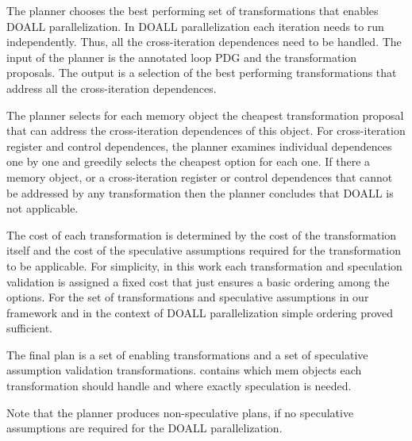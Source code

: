 The planner chooses the best performing set of transformations that
enables DOALL parallelization.
%
In DOALL parallelization each iteration needs to run independently.
Thus, all the cross-iteration dependences need to be handled.
%
The input of the planner is the annotated loop PDG and the
transformation proposals.
%
The output is a selection of the best performing transformations that
address all the cross-iteration dependences. 


%
The planner selects for each memory object the cheapest transformation
proposal that can address the cross-iteration dependences of this
object.
%
%
For cross-iteration register and control dependences, the planner
examines individual dependences one by one and greedily selects the
cheapest option for each one.  
%
If there a memory object, or a cross-iteration register or control
dependences that cannot be addressed by any transformation then the
planner concludes that DOALL is not applicable.


The cost of each transformation is determined by the cost of the
transformation itself and the cost of the speculative assumptions
required for the transformation to be applicable. 
%
For simplicity, in this work each transformation and speculation
validation is assigned a fixed 
cost that just ensures a basic ordering
among the options.
%
%
For the set of transformations and speculative assumptions in our
framework and in the context of DOALL parallelization simple ordering
proved sufficient.


The final plan is a set of enabling transformations and a set of
speculative assumption validation transformations.
contains which mem objects each transformation should handle and where
exactly speculation is needed.

Note that the planner produces non-speculative plans, if no speculative
assumptions are required for the DOALL parallelization.

